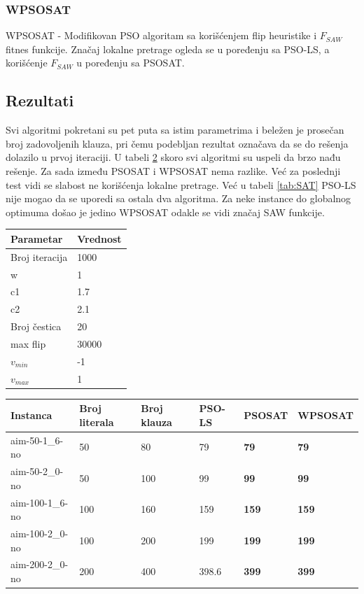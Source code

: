 \documentclass[a4paper]{article}
\begin{document}
\subsubsection{WPSOSAT}
\label{sec:wpsosat}
WPSOSAT - Modifikovan PSO algoritam sa korišćenjem flip heuristike i $F_{SAW}$ fitnes funkcije. Značaj lokalne pretrage ogleda se u poređenju sa PSO-LS, a korišćenje $F_{SAW}$ u poređenju sa PSOSAT.



\subsection{Rezultati}
\label{sec:pso_rezultati}
Svi algoritmi pokretani su pet puta sa istim parametrima i beležen je prosečan broj zadovoljenih klauza, pri čemu podebljan rezultat označava da se do rešenja dolazilo u prvoj iteraciji. U tabeli \ref{tab:UNSAT} skoro svi algoritmi su uspeli da brzo nađu rešenje. Za sada između PSOSAT i WPSOSAT nema razlike. Već za poslednji test vidi se slabost ne korišćenja lokalne pretrage. Već u tabeli \ref{tab:SAT} PSO-LS nije mogao da se uporedi sa ostala dva algoritma. Za neke instance do globalnog optimuma došao je jedino WPSOSAT odakle se vidi značaj SAW funkcije.

\begin{table}[h!]
\centering
{}\label{tab:parametri} 
\begin{tabular}{ |p{3cm}|p{2cm}| }
 \hline
 Parametar 	& Vrednost \\ 
 \hline
 Broj iteracija & 1000 \\
 w & 1 \\
 c1 & 1.7 \\
 c2 & 2.1 \\
 Broj čestica	& 20 \\
 max flip & 30000 \\
 $v_{min}$ & -1 \\
 $v_{max}$ & 1\\ 
 \hline
\end{tabular}
\end{table}


\begin{table}[h!]
\centering
{}\label{tab:UNSAT}
\begin{tabular}{ |p{2.5cm}|p{1.4cm}|p{1.4cm}||p{1.6cm}|p{1.6cm}|p{1.6cm}| } 
\hline
 Instanca & Broj \break literala & Broj \break klauza & PSO-LS & PSOSAT & WPSOSAT \\ 
 \hline
 aim-50-1\_6-no & 50 & 80 & 79 & \textbf{79} & \textbf{79} \\ 
 aim-50-2\_0-no & 50 & 100 & 99 & \textbf{99} & \textbf{99} \\
 aim-100-1\_6-no & 100 & 160 & 159 & \textbf{159} & \textbf{159} \\
 aim-100-2\_0-no & 100 & 200 & 199 & \textbf{199} & \textbf{199} \\
 aim-200-2\_0-no & 200 & 400 & 398.6 & \textbf{399} & \textbf{399} \\
 \hline
\end{tabular}
\end{table}
\end{document}
